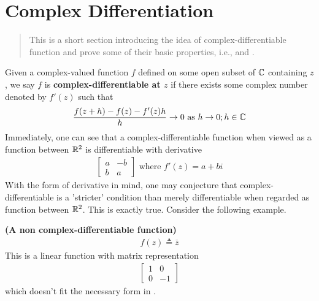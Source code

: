 \documentclass{report}
\begin{document}
\section{Complex Differentiation}
\begin{abstract}
This is a short section introducing the idea of complex-differentiable function and prove some of their basic properties, i.e.,  and . 
\end{abstract}
\begin{mdframed}
Given a complex-valued function $f$ defined on some open subset of  $\mathbb{C}$ containing  $z$, we say  $f$ is \textbf{complex-differentiable at $z$} if there exists some complex number denoted by $f'(z)$ such that 
\begin{align*}
\frac{f(z+h)-f(z)-f'(z)h}{h}\to 0\text{ as }h\to 0;h\in\mathbb{C}
\end{align*}
Immediately, one can see that a complex-differentiable function when viewed as a function between $\mathbb{R}^2$ is differentiable with derivative 
\begin{align}
\label{cd}
  \begin{bmatrix}
    a & -b \\
    b & a
  \end{bmatrix}\text{ where }f'(z)=a+b i
\end{align}
With the form of derivative in mind, one may conjecture that complex-differentiable is a 'stricter' condition than merely differentiable when regarded as function between $\mathbb{R}^2$. This is exactly true. Consider the following example.
\end{mdframed}
\begin{Example}{\textbf{(A non complex-differentiable function)}}{}
\begin{align*}
f(z)\triangleq \overline{z}
\end{align*}
This is a linear function with matrix representation 
\begin{align*}
\begin{bmatrix}
  1&0 \\
  0& -1
\end{bmatrix}
\end{align*}
which doesn't fit the necessary form in .
\end{Example}
\end{document}
